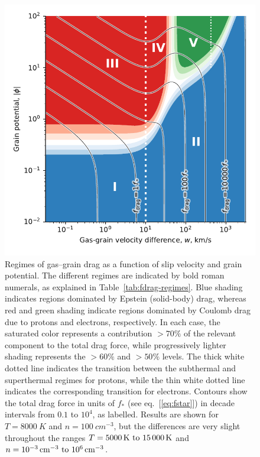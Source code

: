 \message{ !name(dusty-bow-wave.tex)}\documentclass[useAMS, usenatbib, a4paper]{mnras}
\begin{document}
\begin{figure}
  \includegraphics[width=\linewidth]{figs/test-Fdrag-param-space}
  \caption{Regimes of gas--grain drag as a function of slip velocity
    and grain potential.  The different regimes are indicated by bold
    roman numerals, as explained in
    Table~\ref{tab:fdrag-regimes}. Blue shading indicates regions
    dominated by Epstein (solid-body) drag, whereas red and green
    shading indicate regions dominated by Coulomb drag due to protons
    and electrons, respectively.  In each case, the saturated color
    represents a contribution \(> 70\%\) of the relevant component to
    the total drag force, while progressively lighter shading
    represents the \(> 60\%\) and \(> 50\%\) levels.  The thick white
    dotted line indicates the transition between the subthermal and
    superthermal regimes for protons, while the thin white dotted line
    indicates the corresponding transition for electrons.  Contours
    show the total drag force in units of \(f_*\) (see
    eq.~[\ref{eq:fstar}]) in decade intervals from \(0.1\) to
    \(10^4\), as labelled.  Results are shown for
    \(T = \SI{8000}{K}\) and \(n = \SI{100}{cm^{-3}}\), but the
    differences are very slight throughout the ranges
    \(T = \text{\SIrange{5000}{15000}{K}}\) and
    \(n = \text{\SIrange{e-3}{e6}{cm^{-3}}}\).}
  \label{fig:drag-v-phi-plane}
\end{figure}
\end{document}
